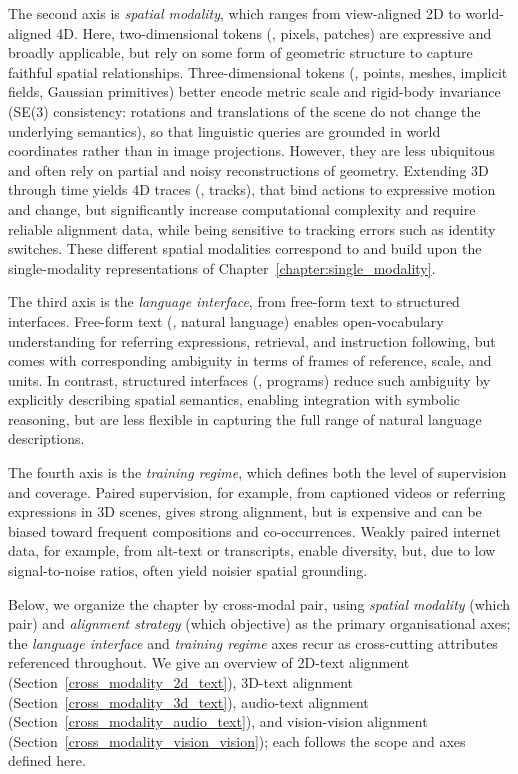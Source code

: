 The second axis is \textit{spatial modality}, which ranges from view-aligned 2D to world-aligned 4D. Here, two-dimensional tokens (\eg, pixels, patches) are expressive and broadly applicable, but rely on some form of geometric structure to capture faithful spatial relationships. 
Three-dimensional tokens (\eg, points, meshes, implicit fields, Gaussian primitives) better encode metric scale and rigid-body invariance (\ie SE(3) consistency: rotations and translations of the scene do not change the underlying semantics), so that linguistic queries are grounded in world coordinates rather than in image projections. 
However, they are less ubiquitous and often rely on partial and noisy reconstructions of geometry. 
Extending 3D through time yields 4D traces (\eg, tracks), that bind actions to expressive motion and change, but significantly increase computational complexity and require reliable alignment data, while being sensitive to tracking errors such as identity switches.
These different spatial modalities correspond to and build upon the single-modality representations of Chapter~\ref{chapter:single_modality}.

The third axis is the \textit{language interface}, from free-form text to structured interfaces. 
Free-form text (\eg, natural language) enables open-vocabulary understanding for referring expressions, retrieval, and instruction following, but comes with corresponding ambiguity in terms of frames of reference, scale, and units. 
In contrast, structured interfaces (\eg, programs) reduce such ambiguity by explicitly describing spatial semantics, enabling integration with symbolic reasoning, but are less flexible in capturing the full range of natural language descriptions.

The fourth axis is the \textit{training regime}, which defines both the level of supervision and coverage. Paired supervision, for example, from captioned videos or referring expressions in 3D scenes, gives strong alignment, but is expensive and can be biased toward frequent compositions and co-occurrences. 
Weakly paired internet data, for example, from alt-text or transcripts, enable diversity, but, due to low signal-to-noise ratios, often yield noisier spatial grounding.

Below, we organize the chapter by cross-modal pair, using \emph{spatial modality} (which pair) and \emph{alignment strategy} (which objective) as the primary organisational axes; the \emph{language interface} and \emph{training regime} axes recur as cross-cutting attributes referenced throughout. 
We give an overview of 2D-text alignment (Section~\ref{cross_modality_2d_text}), 3D-text alignment (Section~\ref{cross_modality_3d_text}), audio-text alignment (Section~\ref{cross_modality_audio_text}), and vision-vision alignment (Section~\ref{cross_modality_vision_vision}); each follows the scope and axes defined here.


